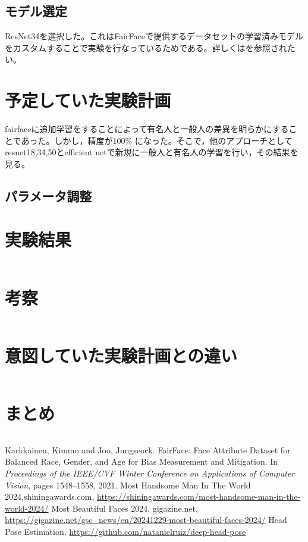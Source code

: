 \documentclass[a4paper,11pt,titlepage]{jsarticle}
\begin{document}
\subsection{モデル選定}
ResNet34を選択した。これはFairFaceで提供するデータセットの学習済みモデルをカスタムすることで実験を行なっているためである。詳しくは\cite{karkkainenfairface}を参照されたい。


\section{予定していた実験計画}
fairfaceに追加学習をすることによって有名人と一般人の差異を明らかにすることであった。しかし，精度が100\% になった。そこで，他のアプローチとしてresnet18,34,50とefficient netで新規に一般人と有名人の学習を行い，その結果を見る。



\subsection{パラメータ調整}




\section{実験結果}
\(\)




\section{考察}
\(\)




\section{意図していた実験計画との違い}
\(\)




\section{まとめ}
\(\)

\begin{thebibliography}{9}
  Karkkainen, Kimmo and Joo, Jungseock.
  FairFace: Face Attribute Dataset for Balanced Race, Gender, and Age for Bias Measurement and Mitigation.
  In \textit{Proceedings of the IEEE/CVF Winter Conference on Applications of Computer Vision}, pages 1548--1558, 2021.
	Most Handsome Man In The World 2024,shiningawards.com, \url{https://shiningawards.com/most-handsome-man-in-the-world-2024/}
	Most Beautiful Faces 2024, gigazine.net, \url{https://gigazine.net/gsc_news/en/20241229-most-beautiful-faces-2024/}
	Head Pose Estimation, \url{https://github.com/natanielruiz/deep-head-pose}
\end{thebibliography}
\end{document}
